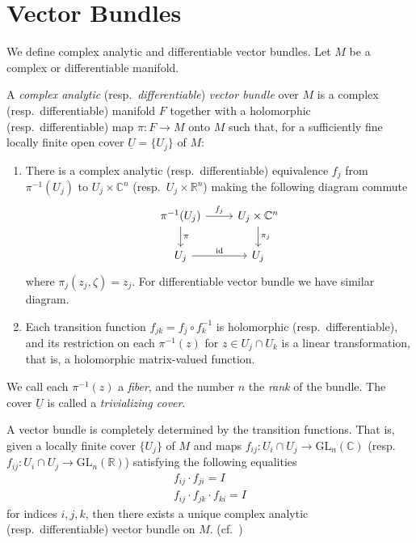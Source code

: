 \section{Vector Bundles}

We define complex analytic and differentiable vector bundles.
Let $M$ be a complex or differentiable manifold.

\begin{defn}
    A \emph{complex analytic} (resp.\ \emph{differentiable}) \emph{vector bundle} over $M$ is a complex (resp.\ differentiable) manifold $F$ together with a holomorphic (resp.\ differentiable) map $\pi:F\to M$ onto $M$ such that, for a sufficiently fine locally finite open cover $\underline{U}=\{U_j\}$ of $M$:
    \begin{enumerate}[(1)]
        \item There is a complex analytic (resp.\ differentiable) equivalence $f_j$ from $\pi^{-1}(U_j)$ to $U_j\times\mathbb{C}^n$ (resp.\ $U_j\times\mathbb{R}^n$) making the following diagram commute
        \[\begin{tikzcd}
            \pi^{-1}(U_j) \ar[d,"\pi"]\ar[r,"f_j"] & U_j\times\mathbb{C}^n \ar[d,"\pi_j"]\\
            U_j \ar[r,"\mathrm{id}"] & U_j
        \end{tikzcd}\]
        where $\pi_j(z_j,\zeta)=z_j$.
        For differentiable vector bundle we have similar diagram.
        \item Each transition function $f_{jk}=f_j\circ f_k^{-1}$ is holomorphic (resp.\ differentiable), and its restriction on each $\pi^{-1}(z)$ for $z\in U_j\cap U_k$ is a linear transformation, that is, a holomorphic matrix-valued function.
    \end{enumerate}
    We call each $\pi^{-1}(z)$ a \emph{fiber}, and the number $n$ the \emph{rank} of the bundle.
    The cover $\underline{U}$ is called a \emph{trivializing cover}.
\end{defn}

\begin{rem}
    A vector bundle is completely determined by the transition functions.
    That is, given a locally finite cover $\{U_j\}$ of $M$ and maps $f_{ij}:U_i\cap U_j\to\mathrm{GL}_n(\mathbb{C})$ (resp.\ $f_{ij}:U_i\cap U_j\to\mathrm{GL}_n(\mathbb{R})$) satisfying the following equalities
    \begin{equation}
        \begin{gathered}
            f_{ij}\cdot f_{ji}=I \\
            f_{ij}\cdot f_{jk}\cdot f_{ki}=I
        \end{gathered}\label{transition functions}
    \end{equation}
    for indices $i,j,k$, then there exists a unique complex analytic (resp.\ differentiable) vector bundle on $M$.
    (cf.\ \cite[p.\ 66]{G-H})
\end{rem}

